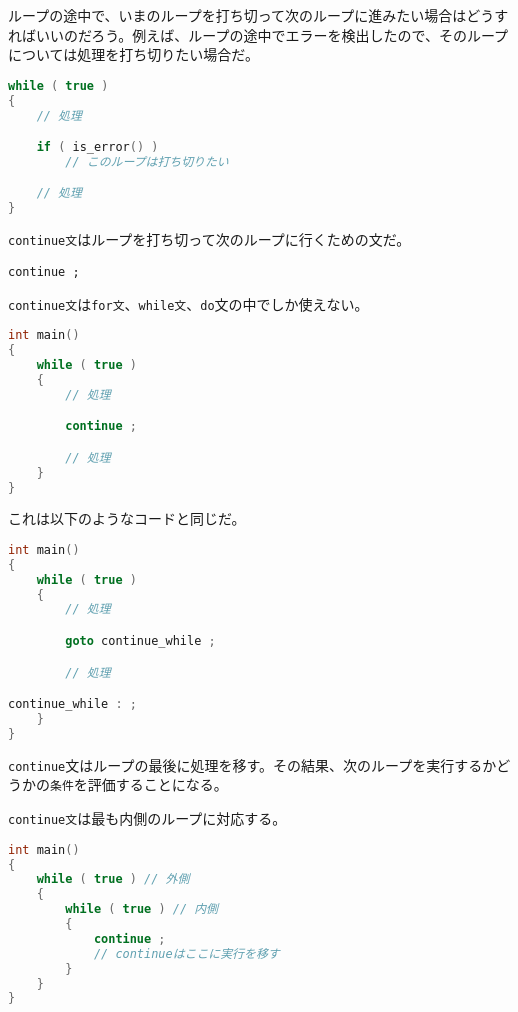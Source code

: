 
ループの途中で、いまのループを打ち切って次のループに進みたい場合はどうすればいいのだろう。例えば、ループの途中でエラーを検出したので、そのループについては処理を打ち切りたい場合だ。

\begin{lstlisting}[language={C++}]
while ( true )
{
    // 処理

    if ( is_error() )
        // このループは打ち切りたい

    // 処理
}
\end{lstlisting}

\texttt{continue文}はループを打ち切って次のループに行くための文だ。

\begin{lstlisting}[style=grammar]
continue ;
\end{lstlisting}

\texttt{continue文}は\texttt{for文}、\texttt{while文}、\texttt{do}文の中でしか使えない。

\ifTombow\pagebreak\fi
\begin{lstlisting}[language={C++}]
int main()
{
    while ( true )
    {
        // 処理

        continue ;

        // 処理
    }
}
\end{lstlisting}

これは以下のようなコードと同じだ。

\begin{lstlisting}[language={C++}]
int main()
{
    while ( true )
    {
        // 処理

        goto continue_while ;

        // 処理

continue_while : ;
    }
}
\end{lstlisting}

\texttt{continue}文はループの最後に処理を移す。その結果、次のループを実行するかどうかの\texttt{条件}を評価することになる。

\texttt{continue文}は最も内側のループに対応する。

\begin{lstlisting}[language={C++}]
int main()
{
    while ( true ) // 外側
    {
        while ( true ) // 内側
        {
            continue ;
            // continueはここに実行を移す
        }
    }
}
\end{lstlisting}

